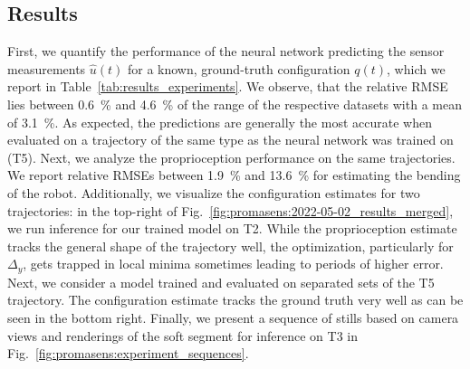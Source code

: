 \subsection{Results}\label{sub:promasens:experimental_results}
First, we quantify the performance of the neural network predicting the sensor measurements $\hat{u}(t)$ for a known, ground-truth configuration $q(t)$, which we report in Table~\ref{tab:results_experiments}.
We observe, that the relative RMSE lies between \SI{0.6}{\percent} and \SI{4.6}{\percent} of the range of the respective datasets with a mean of \SI{3.1}{\percent}.
As expected, the predictions are generally the most accurate when evaluated on a trajectory of the same type as the neural network was trained on (T5).
% 
Next, we analyze the proprioception performance on the same trajectories.
We report relative RMSEs between \SI{1.9}{\percent} and \SI{13.6}{\percent} for estimating the bending of the robot.
Additionally, we visualize the configuration estimates for two trajectories: in the top-right of Fig.~\ref{fig:promasens:2022-05-02_results_merged}, we run inference for our trained model on T2. While the proprioception estimate tracks the general shape of the trajectory well, the optimization, particularly for $\Delta_y$, gets trapped in local minima sometimes leading to periods of higher error.
Next, we consider a model trained and evaluated on separated sets of the T5 trajectory. The configuration estimate tracks the ground truth very well as can be seen in the bottom right.
Finally, we present a sequence of stills based on camera views and renderings of the soft segment for inference on T3 in Fig.~\ref{fig:promasens:experiment_sequences}.

